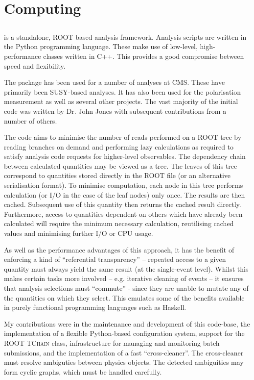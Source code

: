 \chapter{Computing}
\section{}
 is a standalone, \ac{ROOT}-based analysis framework. Analysis
scripts are written in the Python programming language. These make use of
low-level, high-performance classes written in C++. This provides a good
compromise between speed and flexibility.

The  package has been used for a number of analyses at
\ac{CMS}. These have primarily been \ac{SUSY}-based analyses. It has also been
used for the \PW polarisation measurement as well as several other projects. The
vast majority of the initial code was written by Dr. John Jones with subsequent
contributions from a number of others.

The  code aims to minimise the number of reads performed on a
\ac{ROOT} tree by reading branches on demand and performing lazy calculations as
required to satisfy analysis code requests for higher-level observables. The
dependency chain between calculated quantities may be viewed as a tree. The
leaves of this tree correspond to quantities stored directly in the \ac{ROOT}
file (or an alternative serialisation format). To minimise computation, each
node in this tree performs calculation (or I/O in the case of the leaf nodes)
only once. The results are then cached. Subsequent use of this quantity then
returns the cached result directly. Furthermore, access to quantities dependent
on others which have already been calculated will require the minimum necessary
calculation, reutilising cached values and minimising further \ac{I/O} or CPU
usage.

As well as the performance advantages of this approach, it has the benefit of
enforcing a kind of ``referential transparency'' -- repeated access to a given
quantity must always yield the same result (at the single-event level). Whilst
this makes certain tasks more involved -- e.g. iterative cleaning of events --
it ensures that analysis selections must ``commute'' - since they are unable to
mutate any of the quantities on which they select. This emulates some of the
benefits available in purely functional programming languages such as Haskell.

My contributions were in the maintenance and development of this code-base, the
implementation of a flexible Python-based configuration system, support for the
\ac{ROOT} \textsc{TChain} class, infrastructure for managing and monitoring
batch submissions, and the implementation of a fast ``cross-cleaner''. The
cross-cleaner must resolve ambiguties between physics objects. The detected
ambiguities may form cyclic graphs, which must be handled carefully.
